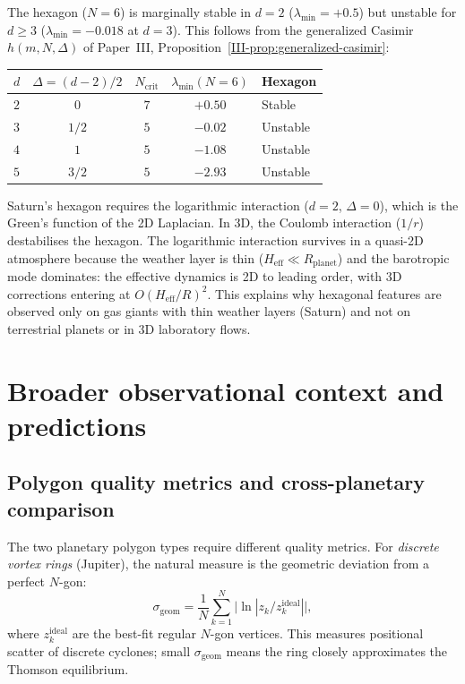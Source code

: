 The hexagon ($N = 6$) is marginally stable in $d = 2$
($\lambda_{\min} = +0.5$) but unstable for $d \ge 3$
($\lambda_{\min} = -0.018$ at $d = 3$).
This follows from the generalized Casimir
$h(m, N, \Delta)$ of Paper~III,
Proposition~\ref{III-prop:generalized-casimir}:
\begin{center}
\small
\begin{tabular}{lcccl}
\toprule
$d$ & $\Delta = (d{-}2)/2$ & $N_{\mathrm{crit}}$ &
  $\lambda_{\min}(N{=}6)$ & Hexagon \\
\midrule
$2$ & $0$ & $7$ & $+0.50$ & Stable \\
$3$ & $1/2$ & $5$ & $-0.02$ & Unstable \\
$4$ & $1$ & $5$ & $-1.08$ & Unstable \\
$5$ & $3/2$ & $5$ & $-2.93$ & Unstable \\
\bottomrule
\end{tabular}
\end{center}
\noindent
Saturn's hexagon requires the logarithmic interaction
($d = 2$, $\Delta = 0$), which is the Green's function of
the 2D Laplacian.  In 3D, the Coulomb interaction ($1/r$)
destabilises the hexagon.
The logarithmic interaction survives in a quasi-2D
atmosphere because the weather layer is thin
($H_{\mathrm{eff}} \ll R_{\mathrm{planet}}$) and the
barotropic mode dominates: the effective dynamics is
2D to leading order, with 3D corrections entering at
$O(H_{\mathrm{eff}}/R)^2$.
This explains why hexagonal features are observed only on
gas giants with thin weather layers (Saturn) and not on
terrestrial planets or in 3D laboratory flows.

\section{Broader observational context and predictions}
\label{sec:observations}
\label{sec:planets}

\subsection{Polygon quality metrics and cross-planetary comparison}

The two planetary polygon types require different quality metrics.
For \emph{discrete vortex rings} (Jupiter), the natural measure is the
geometric deviation from a perfect $N$-gon:
\begin{equation}\label{eq:sigma-geom}
  \sigma_{\mathrm{geom}} = \frac{1}{N}\sum_{k=1}^{N}
  \bigl|\!\ln|z_k / z_k^{\mathrm{ideal}}|\bigr|,
\end{equation}
where $z_k^{\mathrm{ideal}}$ are the best-fit regular $N$-gon vertices.
This measures positional scatter of discrete cyclones; small
$\sigma_{\mathrm{geom}}$ means the ring closely approximates the
Thomson equilibrium.

